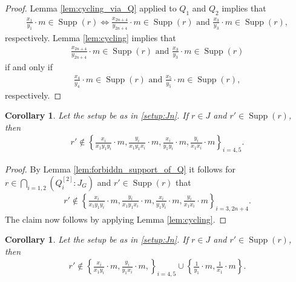 \documentclass[12pt,a4paper]{amsart}
\theoremstyle{plain}
\newtheorem{cor}[thrm]{Corollary}
\def\bcor{\begin{cor}}
\def\ecor{\end{cor}}
\theoremstyle{definition}
\def\bproof{\begin{proof}}
\def\eproof{\end{proof}}
\theoremstyle{remark}
\DeclareMathOperator{\Supp}{Supp}
\begin{document}
\bproof
Lemma \ref{lem:cycling_via_Q} applied to $Q_{1}$ and $Q_{2}$ implies that 
\begin{align*}
    \frac{x_{1}}{y_{1}} \cdot m \in \Supp(r) \iff \frac{x_{2n+4}}{y_{2n+4}} \cdot m \in \Supp(r)  \text{ and } \frac{x_{3}}{y_{3}} \cdot m \in \Supp(r),
\end{align*}
respectively. Lemma \ref{lem:cycling} implies that 
\begin{align*}
\frac{x_{2n+4}}{y_{2n+4}} \cdot m \in \Supp(r)  \text{ and } \frac{x_{3}}{y_{3}} \cdot m \in \Supp(r)
\end{align*}
if and only if 
\begin{align*}
\frac{x_{4}}{y_{4}} \cdot m \in \Supp(r)  \text{ and } \frac{x_{5}}{y_{5}} \cdot m \in \Supp(r),
\end{align*}
respectively.
\eproof


\bcor 
\label{cor:Jn_restrictions_elements_in_support_of_colon}
Let the setup be as in \ref{setup:Jn}. If $r \in J$ and $r' \in \Supp(r)$, then 
\begin{align*}
    r' \notin \left\{ \frac{x_{i}}{x_{1}y_{1}y_{i}} \cdot m, \frac{y_{i}}{x_{1}y_{1}x_{i}} \cdot m, \frac{x_{i}}{y_{1}y_{i}} \cdot m, \frac{y_{i}}{x_{1}x_{i}} \cdot m \right\}_{i=4,5}.
\end{align*}
\ecor  

\bproof
By Lemma \ref{lem:forbiddn_support_of_Q} it follows for $r \in \bigcap_{i=1,2} (Q_{i}^{[2]}:J_{G})$ and $r' \in \Supp(r)$ that 
\begin{align*}
    r' \notin \left\{ \frac{x_{i}}{x_{1}y_{1}y_{i}} \cdot m, \frac{y_{i}}{x_{1}y_{1}x_{i}} \cdot m, \frac{x_{i}}{y_{1}y_{i}} \cdot m, \frac{y_{i}}{x_{1}x_{i}} \cdot m \right\}_{i=3,2n+4}.
\end{align*}
The claim now follows by applying Lemma \ref{lem:cycling}.
\eproof


\bcor
\label{cor:restrictions_supp_r}
Let the setup be as in \ref{setup:Jn}. If $r \in J$ and $r' \in \Supp(r)$, then
\begin{align*}
    r' \notin \left\{ \frac{x_{i}}{x_{1}y_{i}} \cdot m, \frac{y_{i}}{y_{1}x_{i}} \cdot m, \right \}_{i=4,5} \cup \left \{ \frac{1}{y_{1}} \cdot m, \frac{1}{x_{1}} \cdot m \right \}.
\end{align*}
\ecor 
\end{document}
